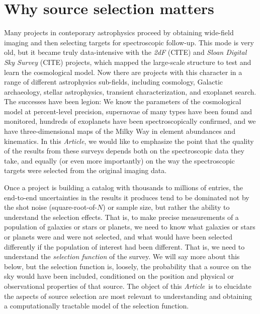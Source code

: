 \documentclass[modern]{aastex62}
\newcommand{\documentname}{\textsl{Article}}
\newcommand{\project}[1]{\textsl{#1}}
\begin{document}

\section{Why source selection matters}

Many projects in conteporary astrophysics proceed by obtaining
wide-field imaging and then selecting targets for spectroscopic
follow-up.
This mode is very old, but it became truly data-intensive with
the \project{2dF} (CITE) and \project{Sloan Digital Sky Survey} (CITE)
projects, which mapped the large-scale structure to test and learn the
cosmological model.
Now there are projects with this character in a range of different
astrophysics sub-fields, including cosmology, Galactic archaeology,
stellar astrophysics, transient characterization, and exoplanet search.
The successes have been legion:
We know the parameters of the cosmological model at percent-level
precision, supernovae of many types have been found and monitored,
hundreds of exoplanets have been spectroscopically confirmed,
and we have three-dimensional maps of the Milky Way in
element abundances and kinematics.
In this \documentname, we would like to emphasize the point that the
quality of the results from these surveys depends both on the
spectroscopic data they take, and equally (or even more importantly)
on the way the spectroscopic targets were selected from the original
imaging data.



Once a project is building a catalog with thousands to millions of entries, the
end-to-end uncertainties in the results it produces tend to be
dominated not by the shot noise (square-root-of-$N$) or sample size,
but rather the ability to understand the selection effects.
That is, to make precise measurements of a population of galaxies or
stars or planets, we need to know what galaxies or stars or planets
were and were not selected, and what would
have been selected differently if the population of interest had been
different.
That is, we need to understand the \emph{selection function} of the
survey.
We will say more about this below, but the selection function is,
loosely, the probability that a source on the sky would have been
included, conditioned on the
position and physical or observational properties of that source.
The object of this \documentname\ is to elucidate the aspects of
source selection are most relevant to understanding and obtaining a
computationally tractable model of the selection function.
\end{document}
